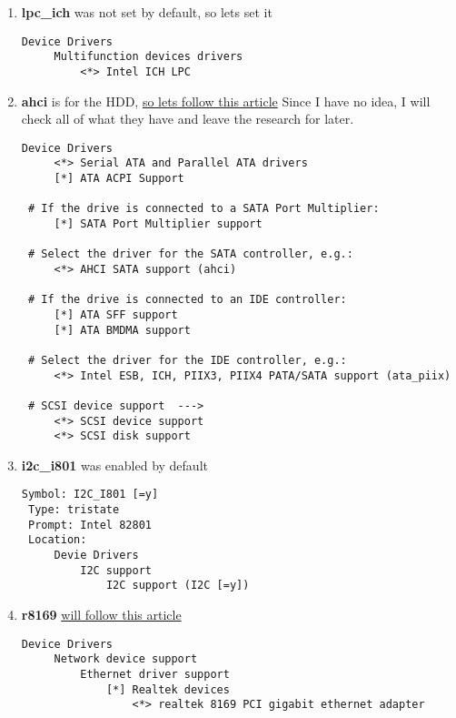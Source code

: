 \documentclass[11pt,a4paper]{article}
\begin{document}
\begin{enumerate}
                   \newpage
                   \item \textbf{lpc\_ich} was not set by default, so lets set it

                       \begin{lstlisting}[style=KernelConfig]
 Device Drivers
     Multifunction devices drivers
         <*> Intel ICH LPC
                       \end{lstlisting}

                   \newpage
                   \item \textbf{ahci} is for the HDD, \href{https://wiki.gentoo.org/wiki/HDD#Kernel}{so lets follow this article} Since I have no idea, I will check all of what they have and leave the research for later.

                       \begin{lstlisting}[style=KernelConfig]
 Device Drivers
     <*> Serial ATA and Parallel ATA drivers
     [*] ATA ACPI Support

 # If the drive is connected to a SATA Port Multiplier:
     [*] SATA Port Multiplier support

 # Select the driver for the SATA controller, e.g.:
     <*> AHCI SATA support (ahci)

 # If the drive is connected to an IDE controller:
     [*] ATA SFF support
     [*] ATA BMDMA support

 # Select the driver for the IDE controller, e.g.:
     <*> Intel ESB, ICH, PIIX3, PIIX4 PATA/SATA support (ata_piix)

 # SCSI device support  --->
     <*> SCSI device support
     <*> SCSI disk support
                       \end{lstlisting}

                   \newpage
                   \item \textbf{i2c\_i801} was enabled by default

                       \begin{lstlisting}[style=KernelConfig]
 Symbol: I2C_I801 [=y]
 Type: tristate
 Prompt: Intel 82801
 Location:
     Devie Drivers
         I2C support
             I2C support (I2C [=y])
                       \end{lstlisting}

                    \newpage
                    \item \textbf{r8169} \href{https://wiki.gentoo.org/wiki/Ethernet#Kernel}{will follow this article}

                        \begin{lstlisting}[style=KernelConfig]
 Device Drivers
     Network device support
         Ethernet driver support
             [*] Realtek devices
                 <*> realtek 8169 PCI gigabit ethernet adapter
                        \end{lstlisting}


\end{enumerate}
\end{document}
